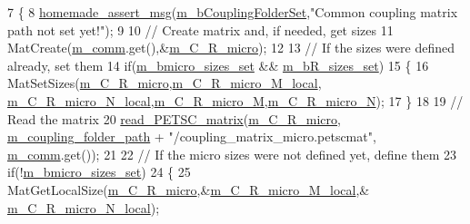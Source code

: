 \begin{DoxyCode}
7 \{
8     \hyperlink{common__header_8h_a593ccc80b790b2268653fcf6597bf451}{homemade\_assert\_msg}(\hyperlink{classcarl_1_1_f_e_t_i___operations_a99e19ecbfadee9c10545ba8ca0682f33}{m\_bCouplingFolderSet},\textcolor{stringliteral}{"Common coupling matrix
       path not set yet!"});
9 
10     \textcolor{comment}{// Create matrix and, if needed, get sizes}
11     MatCreate(\hyperlink{classcarl_1_1_f_e_t_i___operations_a8cb0ed286667fc9f3ebc2d8ef2a3e13b}{m\_comm}.get(),&\hyperlink{classcarl_1_1_f_e_t_i___operations_aa2123fe549c1916496e9ea7e656bb7ee}{m\_C\_R\_micro});
12 
13     \textcolor{comment}{// If the sizes were defined already, set them}
14     \textcolor{keywordflow}{if}(\hyperlink{classcarl_1_1_f_e_t_i___operations_aa3daef2d7401e0988cdea89f7ae31869}{m\_bmicro\_sizes\_set} && \hyperlink{classcarl_1_1_f_e_t_i___operations_a353b1739899d3d0260b97132603dbe02}{m\_bR\_sizes\_set})
15     \{
16         MatSetSizes(\hyperlink{classcarl_1_1_f_e_t_i___operations_aa2123fe549c1916496e9ea7e656bb7ee}{m\_C\_R\_micro},\hyperlink{classcarl_1_1_f_e_t_i___operations_a546bd50866d9e1aa7cab05d688574cfd}{m\_C\_R\_micro\_M\_local},
      \hyperlink{classcarl_1_1_f_e_t_i___operations_a6c67394d9e538b1280b7059ff0258577}{m\_C\_R\_micro\_N\_local},\hyperlink{classcarl_1_1_f_e_t_i___operations_a3a6e9ba77124f48329021505abe6a547}{m\_C\_R\_micro\_M},\hyperlink{classcarl_1_1_f_e_t_i___operations_a067cab6ead10411079ae05a812c35d53}{m\_C\_R\_micro\_N});
17     \}
18 
19     \textcolor{comment}{// Read the matrix}
20     \hyperlink{namespacecarl_ac9086ba3b6072efdbafaaa5ae53927de}{read\_PETSC\_matrix}(\hyperlink{classcarl_1_1_f_e_t_i___operations_aa2123fe549c1916496e9ea7e656bb7ee}{m\_C\_R\_micro},
      \hyperlink{classcarl_1_1_f_e_t_i___operations_a2eee572375e0b5aab15f31fb55f2e48f}{m\_coupling\_folder\_path} + \textcolor{stringliteral}{"/coupling\_matrix\_micro.petscmat"},
      \hyperlink{classcarl_1_1_f_e_t_i___operations_a8cb0ed286667fc9f3ebc2d8ef2a3e13b}{m\_comm}.get());
21 
22     \textcolor{comment}{// If the micro sizes were not defined yet, define them }
23     \textcolor{keywordflow}{if}(!\hyperlink{classcarl_1_1_f_e_t_i___operations_aa3daef2d7401e0988cdea89f7ae31869}{m\_bmicro\_sizes\_set})
24     \{
25         MatGetLocalSize(\hyperlink{classcarl_1_1_f_e_t_i___operations_aa2123fe549c1916496e9ea7e656bb7ee}{m\_C\_R\_micro},&\hyperlink{classcarl_1_1_f_e_t_i___operations_a546bd50866d9e1aa7cab05d688574cfd}{m\_C\_R\_micro\_M\_local},&
      \hyperlink{classcarl_1_1_f_e_t_i___operations_a6c67394d9e538b1280b7059ff0258577}{m\_C\_R\_micro\_N\_local});

\end{DoxyCode}
